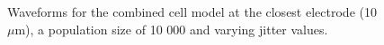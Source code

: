 \documentclass[final, a4paper,masters,en,listoffigures,listoftables,norwegiandates]{NMBU}
\begin{document}
\begin{figure}[htbp]
    \centering
    \vspace*{-3cm}
    \caption{Waveforms for the combined cell model at the closest electrode (10 $\mu$m), a population size of 10 000 and varying jitter values.}
    \label{fig:combinedwavecog}
\end{figure}
\end{document}
